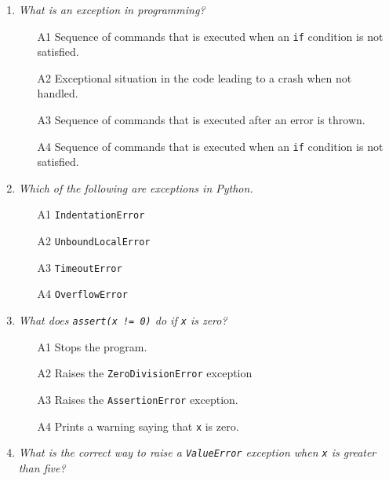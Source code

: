 \begin{enumerate}

\item {\em What is an {\em exception} in programming?}\\

\begin{enumerate}
\item[A1] Sequence of commands that is executed when an {\tt if} condition is not satisfied.
\item[A2] Exceptional situation in the code leading to a crash when not handled. 
\item[A3] Sequence of commands that is executed after an error is thrown.
\item[A4] Sequence of commands that is executed when an {\tt if} condition is not satisfied.
\end{enumerate}

\vspace{6mm}

\item {\em Which of the following are exceptions in Python.}\\

\begin{enumerate}
\item[A1] {\tt IndentationError}
\item[A2] {\tt UnboundLocalError}
\item[A3] {\tt TimeoutError}
\item[A4] {\tt OverflowError}
\end{enumerate}

\vspace{6mm}

\item {\em What does {\tt assert(x != 0)} do if {\tt x} is zero?}\\

\begin{enumerate}
\item[A1] Stops the program.
\item[A2] Raises the {\tt ZeroDivisionError} exception 
\item[A3] Raises the {\tt AssertionError} exception.
\item[A4] Prints a warning saying that {\tt x} is zero.
\end{enumerate}

\vspace{6mm}

\item {\em What is the correct way to raise a {\tt ValueError} exception 
      when {\tt x} is greater than five?}\\


\end{enumerate}
